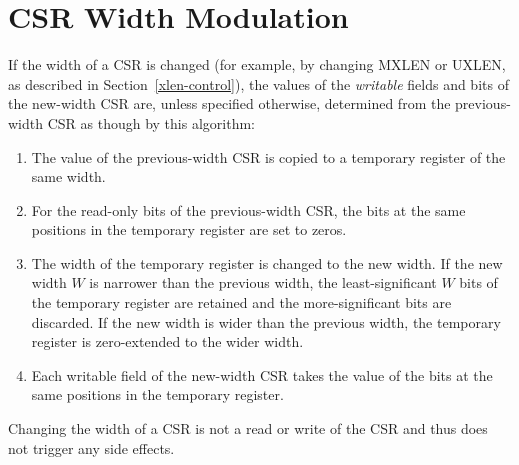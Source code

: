 \section{CSR Width Modulation}
\label{sec:csrwidthmodulation}

If the width of a CSR is changed (for example, by changing MXLEN or UXLEN, as
described in Section~\ref{xlen-control}), the values of the {\em writable}
fields and bits of the new-width CSR are, unless specified otherwise,
determined from the previous-width CSR as though by this algorithm:

\begin{enumerate}

\item The value of the previous-width CSR is copied to a temporary register of
the same width.

\item For the read-only bits of the previous-width CSR, the bits at the same
positions in the temporary register are set to zeros.

\item The width of the temporary register is changed to the new width. If the
new width $W$ is narrower than the previous width, the least-significant $W$
bits of the temporary register are retained and the more-significant bits are
discarded. If the new width is wider than the previous width, the temporary
register is zero-extended to the wider width.

\item Each writable field of the new-width CSR takes the value of the bits at
the same positions in the temporary register.

\end{enumerate}

Changing the width of a CSR is not a read or write of the CSR and thus
does not trigger any side effects.
